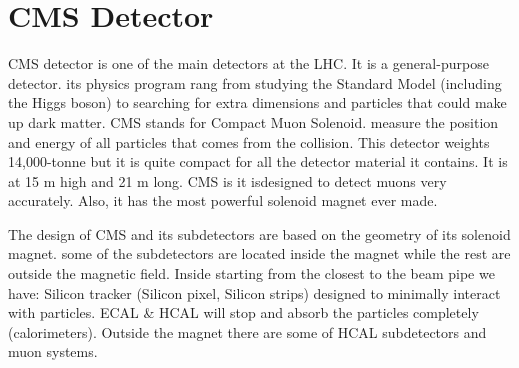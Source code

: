 \section{CMS Detector}
CMS detector is one of the main detectors at the LHC. It is a general-purpose detector. its physics program rang from studying the Standard Model (including the Higgs boson) to searching for extra dimensions and particles that could make up dark matter.
CMS stands for Compact Muon Solenoid. measure the position and energy of all particles that comes from the collision. This detector weights 14,000-tonne but it is quite compact for all the detector material it contains. It is at 15 m high and 21 m long.
CMS is it isdesigned to detect muons very accurately. Also, it has the most powerful solenoid magnet ever made.

The design of CMS and its subdetectors are based on the geometry of its solenoid magnet. some of the subdetectors are located inside the magnet while the rest are outside the magnetic field. Inside starting from the closest to the beam pipe we have: Silicon tracker (Silicon pixel, Silicon strips) designed to minimally interact with particles. ECAL & HCAL will stop and absorb the particles completely (calorimeters).  Outside the magnet there are some of HCAL subdetectors and muon systems.



